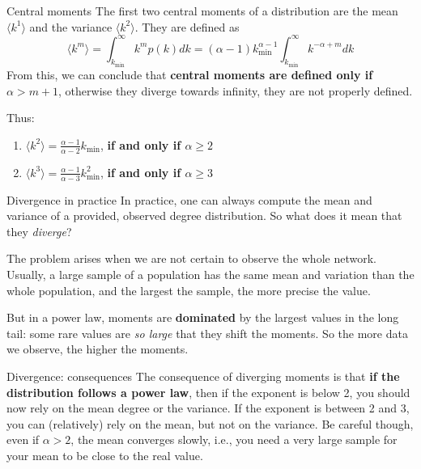 \begin{textbox}{Central moments}
    The first two central moments of a distribution are the mean $\langle k^1 \rangle $ and the variance $\langle k^2 \rangle $. They are defined as
    \[
        \langle k^m \rangle = \int_{k_{\min}}^{\infty}k^mp(k)dk=(\alpha-1)k^{\alpha-1}_{\min}\int_{k_{\min}}^{\infty}k^{-\alpha+m}dk
    \]
    From this, we can conclude that \textbf{central moments are defined only if $\alpha>m+1$}, otherwise they diverge towards infinity, they are not properly defined.

    Thus:
    \begin{enumerate}
        \item $\langle k^2 \rangle = \frac{\alpha-1}{\alpha-2}k_{\min}$, \textbf{if and only if $\alpha\geq 2$}
        \item $\langle k^3 \rangle = \frac{\alpha-1}{\alpha-3}k^2_{\min}$, \textbf{if and only if $\alpha\geq 3$}
    \end{enumerate}
\end{textbox}

\begin{textbox}{Divergence in practice}
    In practice, one can always compute the mean and variance of a provided, observed degree distribution. So what does it mean that they \textit{diverge}?

    The problem arises when we are not certain to observe the whole network. Usually, a large sample of a population has the same mean and variation than the whole population, and the largest the sample, the more precise the value.

    But in a power law, moments are \textbf{dominated} by the largest values in the long tail: some rare values are \textit{so large} that they shift the moments. So the more data we observe, the higher the moments.
\end{textbox}

\begin{textbox}{Divergence: consequences}
    The consequence of diverging moments is that \textbf{if the distribution follows a power law}, then if the exponent is below 2, you should now rely on the mean degree or the variance. If the exponent is between 2 and 3, you can (relatively) rely on the mean, but not on the variance. Be careful though, even if $\alpha>2$, the mean converges slowly, i.e., you need a very large sample for your mean to be close to the real value.
\end{textbox}

